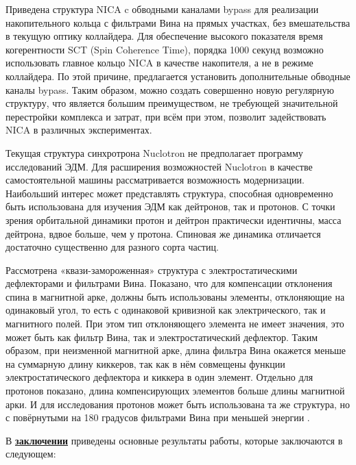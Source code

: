 \par Приведена структура NICA c обводными каналами bypass для реализации накопительного кольца с фильтрами Вина на прямых участках, без вмешательства в текущую оптику коллайдера. Для обеспечение высокого показателя время когерентности SCT (Spin Coherence Time), порядка 1000 секунд возможно использовать главное кольцо NICA в качестве накопителя, а не в режиме коллайдера. По этой причине, предлагается установить дополнительные обводные каналы bypass. Таким образом, можно создать совершенно новую регулярную структуру, что является большим преимуществом, не требующей значительной перестройки комплекса и затрат, при всём при этом, позволит задействовать NICA в различных экспериментах.

\par Текущая структура синхротрона Nuclotron не предполагает программу исследований ЭДМ. Для расширения возможностей Nuclotron в качестве самостоятельной машины рассматривается возможность модернизации. Наибольший интерес может представлять структура, способная одновременно быть использована для изучения ЭДМ как дейтронов, так и протонов. С точки зрения орбитальной динамики протон и дейтрон практически идентичны, масса дейтрона, вдвое больше, чем у протона. Спиновая же динамика отличается достаточно существенно для разного сорта частиц. 

\noindent Рассмотрена «квази-замороженная» структура с электростатическими дефлекторами и фильтрами Вина. Показано, что для компенсации отклонения спина в магнитной арке, должны быть использованы элементы, отклоняющие на одинаковый угол, то есть с одинаковой кривизной как электрического, так и магнитного полей. При этом тип отклоняющего элемента не имеет значения, это может быть как фильтр Вина, так и электростатический дефлектор. Таким образом, при неизменной магнитной арке, длина фильтра Вина окажется меньше на суммарную длину киккеров, так как в нём совмещены функции электростатического дефлектора и киккера в один элемент. Отдельно для протонов показано, длина компенсирующих элементов больше длины магнитной арки. И для исследования протонов может быть использована та же структура, но с повёрнутыми на 180 градусов фильтрами Вина при меньшей энергии \cite{Kolokolchikov:2021trans}.

\FloatBarrier
{}                                  %

В \underline{\textbf{заключении}} приведены основные результаты работы, которые заключаются в следующем:


